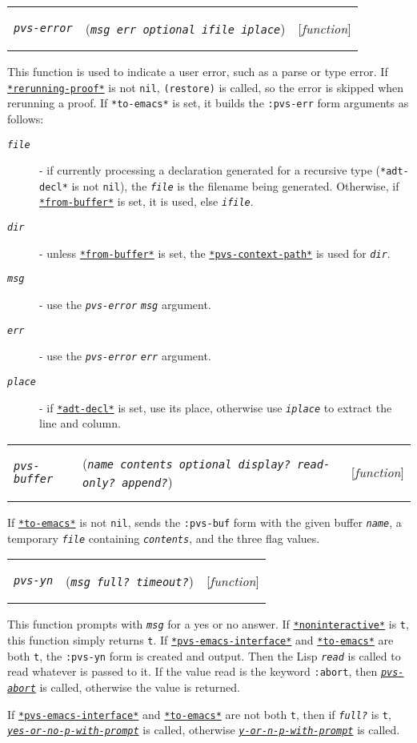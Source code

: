 \documentclass[12pt]{book}
\makeatletter
\def\ampoptional{{\smaller\sc {\smaller\smaller \&}optional\ }}
\newenvironment{function}[3]%
{\par\noindent\begin{boxedminipage}{\textwidth}%
 \par\noindent\begin{tabularx}{\linewidth}{l>{\raggedright}Xr}%
 \functionhtgt{#1}&(\texttt{\textit{#2}})&[\emph{#3}]%
 \end{tabularx}\par\flushright\begin{minipage}{.97\textwidth}}
{\end{minipage}\end{boxedminipage}}
\newcommand{\functionarg}[1]{\texttt{\textit{#1}}}
\newcommand{\functionnm}[1]{\texttt{\textit{#1}}}
\newcommand{\functionhln}[1]{\hyperlink{#1}{\functionnm{#1}}}
\newcommand{\functionhtgt}[1]{\hypertarget{#1}{\functionnm{#1}}\index{#1@\functionnm{#1}|underline}}
\newenvironment{lispfunction}[2]%
{\begin{function}{#1}{#2}{function}}{\end{function}}
\newcommand{\globalnm}[1]{\texttt{\textup{#1}}}
\newcommand{\globalhln}[1]{\hyperlink{#1}{\globalnm{#1}}}
\makeatother
\begin{document}
\begin{lispfunction}{pvs-error}{msg err \ampoptional ifile iplace}
This function is used to indicate a user error, such as a parse or type
error.  If \globalhln{*rerunning-proof*} is not \texttt{nil},
\texttt{(restore)} is called, so the error is skipped when rerunning a
proof.  If \globalnm{*to-emacs*} is set, it builds the \texttt{:pvs-err}
form arguments as follows:
\begin{description}
\item[\functionarg{file}] - if currently processing a declaration generated
for a recursive type (\globalnm{*adt-decl*} is not \texttt{nil}), the
\functionarg{file} is the filename being generated.  Otherwise, if
\globalhln{*from-buffer*} is set, it is used, else \functionarg{ifile}.
\item[\functionarg{dir}] - unless \globalhln{*from-buffer*} is set, the
\globalhln{*pvs-context-path*} is used for \functionarg{dir}.
\item[\functionarg{msg}] - use the \functionnm{pvs-error}
\functionarg{msg} argument.
\item[\functionarg{err}] - use the \functionnm{pvs-error}
\functionarg{err} argument.
\item[\functionarg{place}] - if \globalhln{*adt-decl*} is set, use its
place, otherwise use \functionarg{iplace} to extract the line and column.
\end{description}
\end{lispfunction}

\begin{lispfunction}{pvs-buffer}
  {name contents \ampoptional display? read-only? append?}
If \globalhln{*to-emacs*} is not \texttt{nil}, sends the \texttt{:pvs-buf}
form with the given buffer \functionarg{name}, a temporary
\functionarg{file} containing \functionarg{contents}, and the three flag
values.
\end{lispfunction}

\begin{lispfunction}{pvs-yn}{msg full? timeout?}
This function prompts with \functionarg{msg} for a yes or no answer.
If \globalhln{*noninteractive*} is \texttt{t}, this function simply
returns \texttt{t}.  If \globalhln{*pvs-emacs-interface*} and
\globalhln{*to-emacs*} are both \texttt{t}, the \texttt{:pvs-yn} form is
created and output.  Then the Lisp \functionnm{read} is called to read
whatever is passed to it.  If the value read is the keyword
\texttt{:abort}, then
\functionhln{pvs-abort} is called, otherwise the value is returned.

If \globalhln{*pvs-emacs-interface*} and \globalhln{*to-emacs*} are not
both \texttt{t}, then if \functionarg{full?} is \texttt{t},
\functionhln{yes-or-no-p-with-prompt} is called, otherwise
\functionhln{y-or-n-p-with-prompt} is called.
\end{lispfunction}
\end{document}
